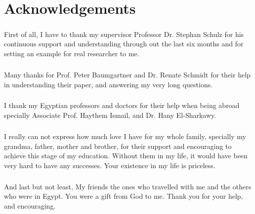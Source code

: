 \chapter*{Acknowledgements}
\label{chap:ack}


\paragraph{}
First of all, I have to thank my supervisor Professor Dr. Stephan Schulz for his continuous support and understanding through out the last six months and for setting an example for real researcher to me.

\paragraph{}
Many thanks for Prof. Peter Baumgartner and Dr. Renate Schmidt for their help in understanding their paper, and answering my very long questions.

\paragraph{}
I thank my Egyptian professors and doctors for their help when being abroad specially Associate Prof. Haythem Ismail, and Dr. Hany El-Sharkawy. 

\paragraph{}
I really can not express how much love I have for my whole family, specially my grandma, father, mother and brother, for their support and encouraging to achieve this stage of my education. Without them in my life, it would have been very hard to have any successes. Your existence in my life is priceless.

\paragraph{}
And last but not least, My friends the ones who travelled with me and the others who were in Egypt. You were a gift from God to me. Thank you for your help, and encouraging. 

